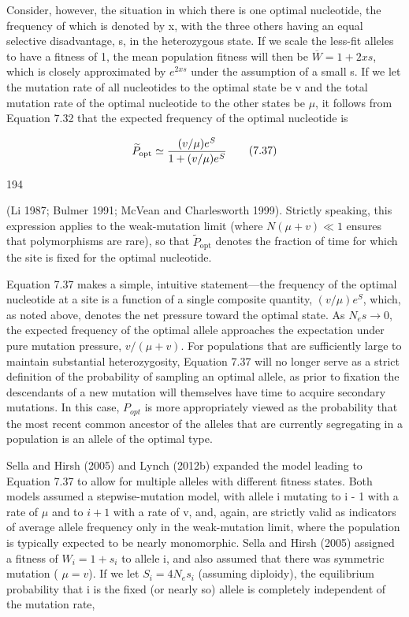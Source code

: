 \documentclass{article}
\begin{document}
Consider, however, the situation in which there is one optimal nucleotide, the frequency of which is denoted by x, with the three others having an equal selective disadvantage, s, in the heterozygous state. If we scale the less-fit alleles to have a fitness of 1, the mean population fitness will then be  $ \overline{W} = 1 + 2xs $, which is closely approximated by  $ e^{2xs} $ under the assumption of a small s. If we let the mutation rate of all nucleotides to the optimal state be v and the total mutation rate of the optimal nucleotide to the other states be  $ \mu $, it follows from Equation 7.32 that the expected frequency of the optimal nucleotide is

\begin{equation}
\begin{align*}\widetilde{P}_{\rm opt}\simeq{(v/\mu)e^S\over1+(v/\mu)e^S}\end{align*}
\tag{7.37}
\label{eq:7_37}
\end{equation}

194

(Li 1987; Bulmer 1991; McVean and Charlesworth 1999). Strictly speaking, this expression applies to the weak-mutation limit (where  $ N(\mu + v) \ll 1 $ ensures that polymorphisms are rare), so that  $ \widetilde{P}_{\mathrm{opt}} $ denotes the fraction of time for which the site is fixed for the optimal nucleotide.

Equation 7.37 makes a simple, intuitive statement—the frequency of the optimal nucleotide at a site is a function of a single composite quantity,  $ (v/\mu)e^{S} $, which, as noted above, denotes the net pressure toward the optimal state. As  $ N_{e}s \rightarrow 0 $, the expected frequency of the optimal allele approaches the expectation under pure mutation pressure,  $ v/(\mu + v) $. For populations that are sufficiently large to maintain substantial heterozygosity, Equation 7.37 will no longer serve as a strict definition of the probability of sampling an optimal allele, as prior to fixation the descendants of a new mutation will themselves have time to acquire secondary mutations. In this case,  $ P_{opt} $ is more appropriately viewed as the probability that the most recent common ancestor of the alleles that are currently segregating in a population is an allele of the optimal type.

Sella and Hirsh (2005) and Lynch (2012b) expanded the model leading to Equation 7.37 to allow for multiple alleles with different fitness states. Both models assumed a stepwise-mutation model, with allele i mutating to i - 1 with a rate of  $ \mu $ and to  $ i + 1 $ with a rate of v, and, again, are strictly valid as indicators of average allele frequency only in the weak-mutation limit, where the population is typically expected to be nearly monomorphic. Sella and Hirsh (2005) assigned a fitness of  $ W_i = 1 + s_i $ to allele i, and also assumed that there was symmetric mutation ( $ \mu = v $). If we let  $ S_i = 4N_e s_i $ (assuming diploidy), the equilibrium probability that i is the fixed (or nearly so) allele is completely independent of the mutation rate,
\end{document}
